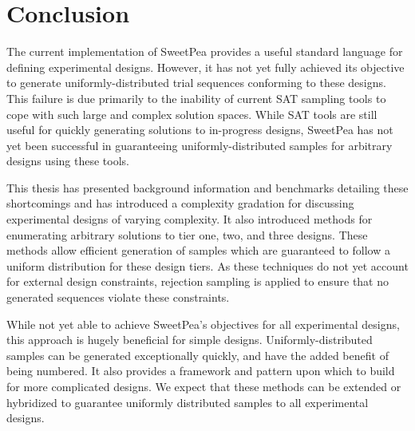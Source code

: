 
\chapter{Conclusion}

The current implementation of SweetPea provides a useful standard language for defining experimental designs. However, it has not yet fully achieved its objective to generate uniformly-distributed trial sequences conforming to these designs. This failure is due primarily to the inability of current SAT sampling tools to cope with such large and complex solution spaces. While SAT tools are still useful for quickly generating solutions to in-progress designs, SweetPea has not yet been successful in guaranteeing uniformly-distributed samples for arbitrary designs using these tools.

This thesis has presented background information and benchmarks detailing these shortcomings and has introduced a complexity gradation for discussing experimental designs of varying complexity. It also introduced methods for enumerating arbitrary solutions to tier one, two, and three designs. These methods allow efficient generation of samples which are guaranteed to follow a uniform distribution for these design tiers. As these techniques do not yet account for external design constraints, rejection sampling is applied to ensure that no generated sequences violate these constraints.

While not yet able to achieve SweetPea's objectives for all experimental designs, this approach is hugely beneficial for simple designs. Uniformly-distributed samples can be generated exceptionally quickly, and have the added benefit of being numbered. It also provides a framework and pattern upon which to build for more complicated designs. We expect that these methods can be extended or hybridized to guarantee uniformly distributed samples to all experimental designs.
